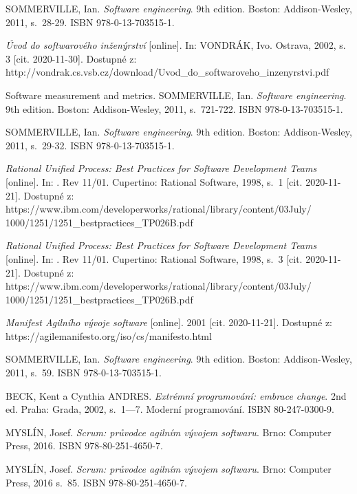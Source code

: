 \documentclass[czech,master]{diploma}
\begin{document}
\begin{thebibliography}{43}

SOMMERVILLE, Ian. \textit{Software engineering}. 9th edition. Boston: Addison-Wesley, 2011, s.~28-29. ISBN 978-0-13-703515-1.

\textit{Úvod do softwarového inženýrství} [online]. In: VONDRÁK, Ivo. Ostrava, 2002, s. 3 [cit. 2020-11-30]. Dostupné z: http://vondrak.cs.vsb.cz/download/Uvod\_do\_softwaroveho\_inzenyrstvi.pdf

Software measurement and metrics. SOMMERVILLE, Ian. \textit{Software engineering}. 9th edition. Boston: Addison-Wesley, 2011, s.~721-722. ISBN 978-0-13-703515-1.

SOMMERVILLE, Ian. \textit{Software engineering}. 9th edition. Boston: Addison-Wesley, 2011, s.~29-32. ISBN 978-0-13-703515-1.

\textit{Rational Unified Process: Best Practices for Software Development Teams} [online]. In: . Rev 11/01. Cupertino: Rational Software, 1998, s.~1 [cit. 2020-11-21]. Dostupné z: https://www.ibm.com/developerworks/rational/library/content/03July/
1000/1251/1251\_bestpractices\_TP026B.pdf

\textit{Rational Unified Process: Best Practices for Software Development Teams} [online]. In: . Rev 11/01. Cupertino: Rational Software, 1998, s.~3 [cit. 2020-11-21]. Dostupné z: https://www.ibm.com/developerworks/rational/library/content/03July/
1000/1251/1251\_bestpractices\_TP026B.pdf

\textit{Manifest Agilního vývoje software} [online]. 2001 [cit. 2020-11-21]. Dostupné z: https://agilemanifesto.org/iso/cs/manifesto.html

SOMMERVILLE, Ian. \textit{Software engineering}. 9th edition. Boston: Addison-Wesley, 2011, s.~59. ISBN 978-0-13-703515-1.

BECK, Kent a Cynthia ANDRES. \textit{Extrémní programování: embrace change}. 2nd ed. Praha: Grada, 2002, s.~1---7. Moderní programování. ISBN 80-247-0300-9.

MYSLÍN, Josef. \textit{Scrum: průvodce agilním vývojem softwaru}. Brno: Computer Press, 2016. ISBN 978-80-251-4650-7.

MYSLÍN, Josef. \textit{Scrum: průvodce agilním vývojem softwaru}. Brno: Computer Press, 2016 s.~85. ISBN 978-80-251-4650-7.


\end{thebibliography}
\end{document}
